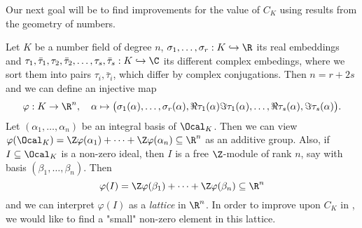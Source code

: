 Our next goal will be to find improvements for the value of \( C_K \) using results from the geometry of numbers.

\begin{idee*}
	Let \( K \) be a number field of degree \( n \), \( \sigma_1, \dotsc, \sigma_r: K \hookrightarrow \R \) its real embeddings and \( \tau_1, \bar{\tau}_1, \tau_2, \bar{\tau}_2, \dotsc, \tau_s, \bar{\tau}_s: K \hookrightarrow \C \) its different complex embedings, where we sort them into pairs \( \tau_i, \bar{\tau}_i \), which differ by complex conjugations.
	Then \( n = r + 2s \) and we can define an injective map 
	\[ \varphi: K \to \R^n,\quad \alpha \mapsto \big( \sigma_1(\alpha), \dotsc, \sigma_r(\alpha), \Re \tau_1(\alpha) \Im \tau_1(\alpha), \dotsc, \Re \tau_s(\alpha), \Im \tau_s(\alpha) \big). \]
	Let \( (\alpha_1, \dotsc, \alpha_n) \) be an integral basis of \( \Ocal_K \).
	Then we can view \( \varphi(\Ocal_K) = \Z \varphi(\alpha_1) + \dots + \Z \varphi(\alpha_n) \subseteq \R^n \) as an additive group.
	Also, if \( I \subseteq \Ocal_K \) is a non-zero ideal, then \( I \) is a free \( \Z \)-module of rank \( n \), say with basis \( (\beta_1, \dotsc, \beta_n) \).
	Then
	\[ \varphi(I) = \Z \varphi(\beta_1) + \dots + \Z \varphi(\beta_n) \subseteq \R^n \]
	and we can interpret \( \varphi(I) \) as a \emph{lattice} in \( \R^n \).
	In order to improve upon \( C_K \) in  , we would like to find a "small" non-zero element in this lattice.
\end{idee*}